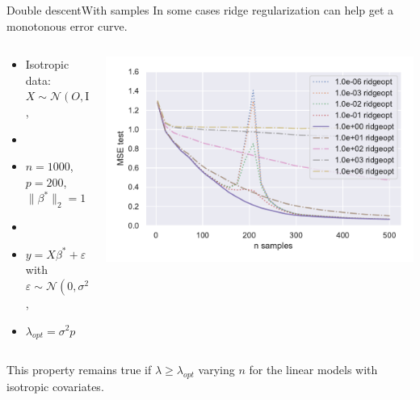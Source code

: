 \documentclass[10pt,aspectratio=43]{beamer}
\begin{document}
\begin{frame}{Double descent}{With samples \citep{nakkiran2020optimal}}
    In some cases ridge regularization can help get a monotonous error curve.
    \begin{columns}
        \begin{column}{0.46\textwidth}
            \begin{itemize}
                \item Isotropic data: $X\sim\mathcal{N}(O,\mathrm{Id})$,
                \item[]
                \item $n=1000$, $p=200$, $\|\beta^*\|_2=1$
                \item[]
                \item $y = X\beta^*+\varepsilon$ with $\varepsilon\sim \mathcal{N}(0, \sigma^2\mathrm{Id})$,
                \item $\lambda_{opt} = \sigma^2p$
            \end{itemize}
        \end{column}
        \begin{column}{0.7\textwidth}
            \begin{center}
             \includegraphics[width=1\textwidth]{double_descent_sup.pdf}
             \end{center}
        \end{column}
        \end{columns}
        \begin{block}{}
        This property remains true if $\lambda \geq \lambda_{opt}$ varying $n$ for the linear models with isotropic covariates.
        \end{block}
\end{frame}


\begin{frame}
    
\end{frame}
\end{document}
